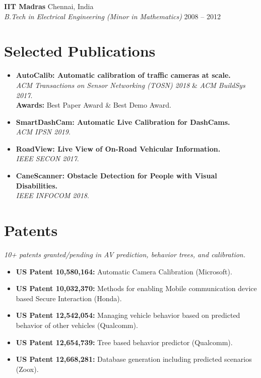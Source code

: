 \documentclass[10pt,letterpaper]{article}
\begin{document}
\textbf{IIT Madras} \hfill Chennai, India \\
\textit{B.Tech in Electrical Engineering (Minor in Mathematics)} \hfill 2008 -- 2012

\section{Selected Publications}
\begin{itemize}
    \item \textbf{AutoCalib: Automatic calibration of traffic cameras at scale.} \\
    \textit{ACM Transactions on Sensor Networking (TOSN) 2018} \& \textit{ACM BuildSys 2017}. \\
    \textbf{Awards:} Best Paper Award \& Best Demo Award.
    \item \textbf{SmartDashCam: Automatic Live Calibration for DashCams.} \\
    \textit{ACM IPSN 2019}.
    \item \textbf{RoadView: Live View of On-Road Vehicular Information.} \\
    \textit{IEEE SECON 2017}.
    \item \textbf{CaneScanner: Obstacle Detection for People with Visual Disabilities.} \\
    \textit{IEEE INFOCOM 2018}.
\end{itemize}

\section{Patents}
\textit{10+ patents granted/pending in AV prediction, behavior trees, and calibration.}
\begin{itemize}
    \item \textbf{US Patent 10,580,164:} Automatic Camera Calibration (Microsoft).
    \item \textbf{US Patent 10,032,370:} Methods for enabling Mobile communication device based Secure Interaction (Honda).
    \item \textbf{US Patent 12,542,054:} Managing vehicle behavior based on predicted behavior of other vehicles (Qualcomm).
    \item \textbf{US Patent 12,654,739:} Tree based behavior predictor (Qualcomm).
    \item \textbf{US Patent 12,668,281:} Database generation including predicted scenarios (Zoox).
\end{itemize}
\end{document}
